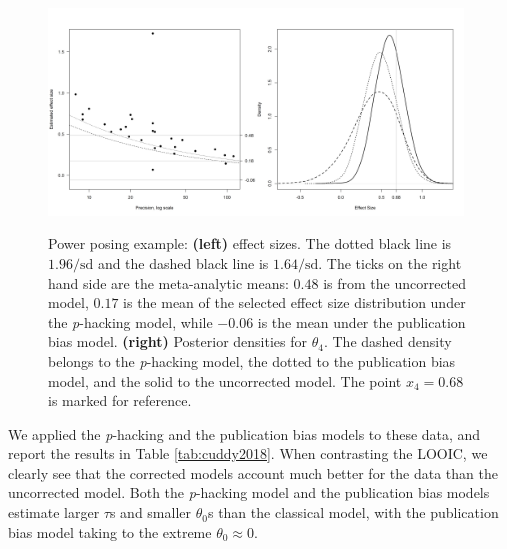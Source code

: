 \documentclass[preprint, authoryear]{elsarticle}
\theoremstyle{plain}
\theoremstyle{definition}
\begin{document}
\begin{figure}
\noindent \begin{centering}
\includegraphics[width=0.49\textwidth]{plots/cuddy2018}\includegraphics[width=0.49\textwidth]{plots/cuddy2018_posterior}
\par\end{centering}
\caption{\label{fig:cuddy2017} Power posing example: \textbf{(left)} effect sizes. The dotted black line is $1.96/\textrm{sd}$ and the dashed black line is $1.64/\textrm{sd}$. The ticks on the right hand side are
the meta-analytic means: $0.48$ is from the uncorrected model, $0.17$ is the mean of the selected effect size distribution under the \emph{p}-hacking model, while $-0.06$ is the mean under the publication bias model. \textbf{(right)} Posterior densities for $\theta_{4}$. The dashed density belongs to the \emph{p}-hacking model, the dotted to the publication bias model, and the solid to the uncorrected model. The point $x_{4}=0.68$ is marked for reference.}
\end{figure}

We applied the \emph{p}-hacking and the publication bias models to these data, and report the results in Table \ref{tab:cuddy2018}. When contrasting the LOOIC, we clearly see that the corrected models account much better for the data than the uncorrected model. Both the \emph{p}-hacking model and the publication bias models estimate
larger $\tau$s and smaller $\theta_{0}$s than the classical model, with the publication bias model taking to the extreme $\theta_{0}\approx0$.
\end{document}
